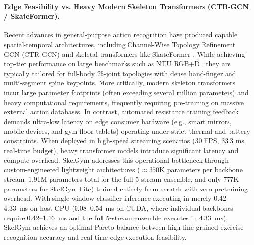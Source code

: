 \documentclass[preprint,12pt]{elsarticle}
\begin{document}
\paragraph{Edge Feasibility vs. Heavy Modern Skeleton Transformers (CTR-GCN / SkateFormer).}
Recent advances in general-purpose action recognition have produced capable spatial-temporal architectures, including Channel-Wise Topology Refinement GCN (CTR-GCN) \cite{chen2021channel} and skeletal transformers like SkateFormer \cite{zheng2024skateformer}. While achieving top-tier performance on large benchmarks such as NTU RGB+D \cite{shahroudy2016}, they are typically tailored for full-body 25-joint topologies with dense hand-finger and multi-segment spine keypoints. More critically, modern skeleton transformers incur large parameter footprints (often exceeding several million parameters) and heavy computational requirements, frequently requiring pre-training on massive external action databases.
In contrast, automated resistance training feedback demands ultra-low latency on edge consumer hardware (e.g., smart mirrors, mobile devices, and gym-floor tablets) operating under strict thermal and battery constraints. When deployed in high-speed streaming scenarios (30 FPS, $33.3\text{ ms}$ real-time budget), heavy transformer models introduce significant latency and compute overhead. SkelGym addresses this operational bottleneck through custom-engineered lightweight architectures ($\approx 350\text{K}$ parameters per backbone stream, 1.91M parameters total for the full 5-stream ensemble, and only 777K parameters for SkelGym-Lite) trained entirely from scratch with zero pretraining overhead. With single-window classifier inference executing in merely 0.42--4.33~ms on host CPU (0.08--0.54~ms on CUDA, where individual backbones require 0.42--1.16~ms and the full 5-stream ensemble executes in 4.33~ms), SkelGym achieves an optimal Pareto balance between high fine-grained exercise recognition accuracy and real-time edge execution feasibility.
\end{document}
